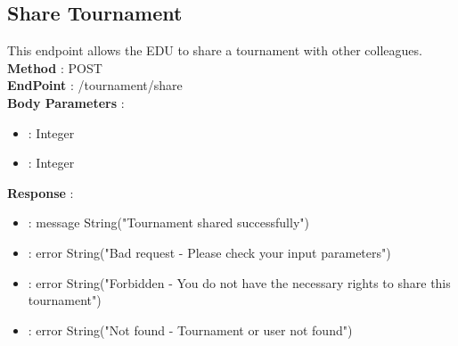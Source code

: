 \subsection*{Share Tournament}
This endpoint allows the EDU to share a tournament with other colleagues.\\
\textbf{Method} : POST \\
\textbf{EndPoint} : /tournament/share \\
\textbf{Body Parameters} :
\begin{itemize}
    \item {} : Integer
    \item {} : Integer
\end{itemize}
\textbf{Response} :
\begin{itemize}
    \item {} : message String("Tournament shared successfully")
    \item {} : error String("Bad request - Please check your input parameters")
    \item {} : error String("Forbidden - You do not have the necessary rights to share this tournament")
    \item {} : error String("Not found - Tournament or user not found")
\end{itemize}

